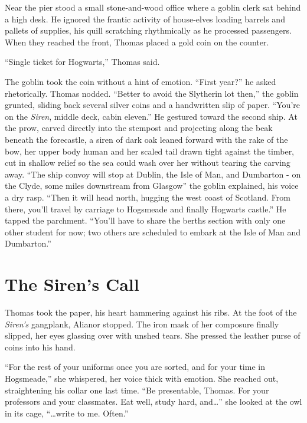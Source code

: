 Near the pier stood a small stone-and-wood office where a goblin clerk sat behind a high desk. He ignored the frantic activity of house-elves loading barrels and pallets of supplies, his quill scratching rhythmically as he processed passengers. When they reached the front, Thomas placed a gold coin on the counter.

\enquote{Single ticket for Hogwarts,} Thomas said.

The goblin took the coin without a hint of emotion. \enquote{First year?} he asked rhetorically. Thomas nodded. \enquote{Better to avoid the Slytherin lot then,} the goblin grunted, sliding back several silver coins and a handwritten slip of paper. \enquote{You're on the \textit{Siren}, middle deck, cabin eleven.} He gestured toward the second ship. At the prow, carved directly into the stempost and projecting along the beak beneath the forecastle, a siren of dark oak leaned forward with the rake of the bow, her upper body human and her scaled tail drawn tight against the timber, cut in shallow relief so the sea could wash over her without tearing the carving away. \enquote{The ship convoy will stop at Dublin, the Isle of Man, and Dumbarton - on the Clyde,  some miles downstream from Glasgow} the goblin explained, his voice a dry rasp. \enquote{Then it will head north, hugging the west coast of Scotland. From there, you'll travel by carriage to Hogsmeade and finally Hogwarts castle.} He tapped the parchment. \enquote{You'll have to share the berths section with only one other student for now; two others are scheduled to embark at the Isle of Man and Dumbarton.}

\section*{The Siren's Call}

Thomas took the paper, his heart hammering against his ribs. At the foot of the \textit{Siren's} gangplank, Alianor stopped. The iron mask of her composure finally slipped, her eyes glassing over with unshed tears. She pressed the leather purse of coins into his hand.

\enquote{For the rest of your uniforms once you are sorted, and for your time in Hogsmeade,} she whispered, her voice thick with emotion. She reached out, straightening his collar one last time. \enquote{Be presentable, Thomas. For your professors and your classmates. Eat well, study hard, and\ldots{}} she looked at the owl in its cage, \enquote{\ldots{}write to me. Often.}

